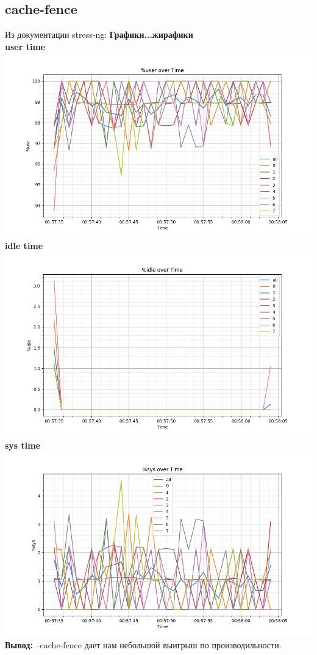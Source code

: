 \subsection{cache-fence}
Из документации stress-ng:
\textbf{Графики...жирафики}\\
\textbf{user time}\\
\includegraphics[width=\textwidth]{./cache/image/l1cache-fence-usr.png}
\textbf{idle time}\\
\includegraphics[width=\textwidth]{./cache/image/l1cache-fence-idle.png}
\textbf{sys time}\\
\includegraphics[width=\textwidth]{./cache/image/l1cache-fence-sys.png}
\textbf{Вывод:} --cache-fence дает нам небольшой выигрыш по производильности.\\


